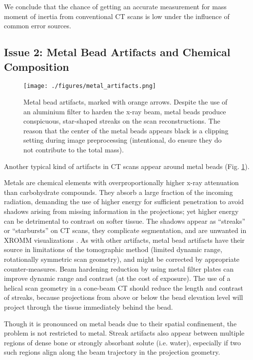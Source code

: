 We conclude that the chance of getting an accurate measurement for mass moment of inertia from conventional CT scans is low under the influence of common error sources.



\subsection{Issue 2: Metal Bead Artifacts and Chemical Composition}
\label{sec:org85a3249}

\begin{figure}[p]
\centering
\texttt{[image: ./figures/metal\_artifacts.png]}
\caption{\label{fig:metal_artifacts}Metal bead artifacts, marked with orange arrows. Despite the use of an aluminium filter to harden the x-ray beam, metal beads produce conspicuous, star-shaped streaks on the scan reconstructions. The reason that the center of the metal beads appears black is a clipping setting during image preprocessing (intentional, do ensure they do not contribute to the total mass).}
\end{figure}

Another typical kind of artifacts in CT scans appear around metal beads (Fig. \ref{fig:metal_artifacts}).

Metals are chemical elements with overproportionally higher x-ray attenuation than carbohydrate compounds.
They absorb a large fraction of the incoming radiation, demanding the use of higher energy for sufficient penetration to avoid shadows arising from missing information in the projections; yet higher energy can be detrimental to contrast on softer tissue.
The shadows appear as ``streaks'' or ``starbursts'' on CT scans, they complicate segmentation, and are unwanted in XROMM visualizations \citep{Brainerd2010}.
As with other artifacts, metal bead artifacts have their source in limitations of the tomographic method (limited dynamic range, rotationally symmetric scan geometry), and might be corrected by appropriate counter-measures.
Beam hardening reduction by using metal filter plates can improve dynamic range and contrast (at the cost of exposure).
The use of a helical scan geometry in a cone-beam CT should reduce the length and contrast of streaks, because projections from above or below the bead elevation level will project through the tissue immediately behind the bead.

Though it is pronounced on metal beads due to their spatial confinement, the problem is not restricted to metal.
Streak artifacts also appear between multiple regions of dense bone or strongly absorbant solute (i.e. water), especially if two such regions align along the beam trajectory in the projection geometry.


